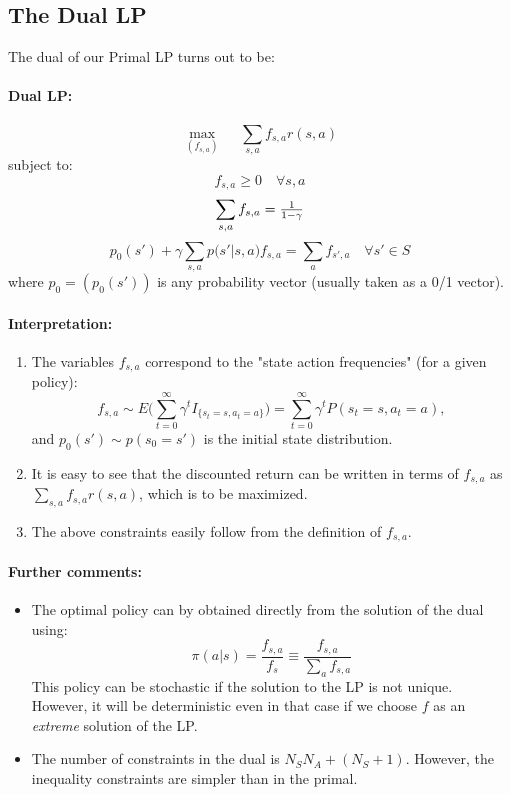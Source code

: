 \subsection{The Dual LP}
The dual of our Primal LP turns out to be:

\paragraph{Dual LP:} 	\[\mathop {\max }\limits_{({f_{s,a}})} \quad \;\sum\limits_{s,a} {{f_{s,a}}r(s,a)} \]
   		subject to:	\[{f_{s,a}} \ge 0\quad \forall s,a\]
				\[\sum\limits_{s,a} {{f_{s,a}}}  = {\textstyle{1 \over {1 - \gamma }}}\]
				\[{p_0}(s') + \gamma \sum\limits_{s,a} {p(} s'|s,a){f_{s,a}} = \sum\limits_{a} {{f_{s',a}}\quad \forall s'}  \in S\]
where ${p_0} = ({p_0}(s'))$ is any probability vector (usually taken as a 0/1 vector).

\paragraph{Interpretation:}
\begin{enumerate}
  \item The variables ${f_{s,a}}$ correspond to the "state action frequencies" (for a given policy):
                            \[{f_{s,a}} \sim E(\sum\limits_{t = 0}^\infty  {{\gamma ^t}{I_{\{ {s_t} = s,{a_t} = a\} }})}  = \sum\limits_{t = 0}^\infty  {{\gamma ^t}P({s_t} = s,{a_t} = a)}, \]
and ${p_0}(s') \sim p({s_0} = s')$ is the initial state distribution.
  \item It is easy to see that the discounted return can be written in terms of ${f_{s,a}}$ as $\sum\limits_{s,a} {{f_{s,a}}r(s,a)} $, which is to be maximized.
  \item The above constraints easily follow from the definition of ${f_{s,a}}$.
\end{enumerate}
\paragraph{Further comments:}
\begin{itemize}
  \item The optimal policy can by obtained directly from the solution of the dual using:
                                           \[\pi (a|s) = \frac{{{f_{s,a}}}}{{{f_s}}} \equiv \frac{{{f_{s,a}}}}{{\sum\nolimits_a {{f_{s,a}}} }}\]
This policy can be stochastic if the solution to the LP is not unique. However, it will be deterministic even in that case if we choose $f$ as an \emph{extreme} solution of the LP.
  \item The number of constraints in the dual is ${N_S}{N_A} + ({N_S} + 1)$. However, the inequality constraints are simpler than in the primal.
\end{itemize}
